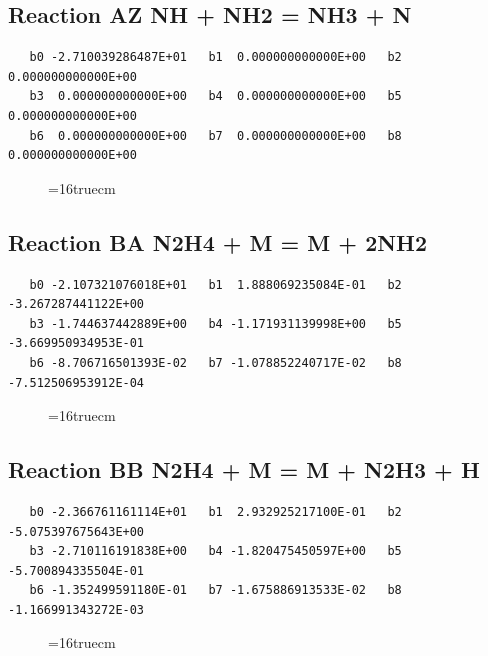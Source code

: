 \documentclass[12pt,dvipdfm]{article}
\begin{document}
\subsection{
Reaction AZ NH + NH2 = NH3 + N }
\begin{small}\begin{verbatim}
   b0 -2.710039286487E+01   b1  0.000000000000E+00   b2  0.000000000000E+00
   b3  0.000000000000E+00   b4  0.000000000000E+00   b5  0.000000000000E+00
   b6  0.000000000000E+00   b7  0.000000000000E+00   b8  0.000000000000E+00
\end{verbatim}\end{small}
\begin{figure}[h!] \label{n2rates}
\epsfxsize=16truecm
\end{figure}
\newpage

\subsection{
Reaction BA N2H4 + M = M + 2NH2 }
\begin{small}\begin{verbatim}
   b0 -2.107321076018E+01   b1  1.888069235084E-01   b2 -3.267287441122E+00
   b3 -1.744637442889E+00   b4 -1.171931139998E+00   b5 -3.669950934953E-01
   b6 -8.706716501393E-02   b7 -1.078852240717E-02   b8 -7.512506953912E-04
\end{verbatim}\end{small}
\begin{figure}[h!] \label{n2rates}
\epsfxsize=16truecm
\end{figure}
\newpage

\subsection{
Reaction BB N2H4 + M = M + N2H3 + H }
\begin{small}\begin{verbatim}
   b0 -2.366761161114E+01   b1  2.932925217100E-01   b2 -5.075397675643E+00
   b3 -2.710116191838E+00   b4 -1.820475450597E+00   b5 -5.700894335504E-01
   b6 -1.352499591180E-01   b7 -1.675886913533E-02   b8 -1.166991343272E-03
\end{verbatim}\end{small}
\begin{figure}[h!] \label{n2rates}
\epsfxsize=16truecm
\end{figure}
\newpage
\end{document}
